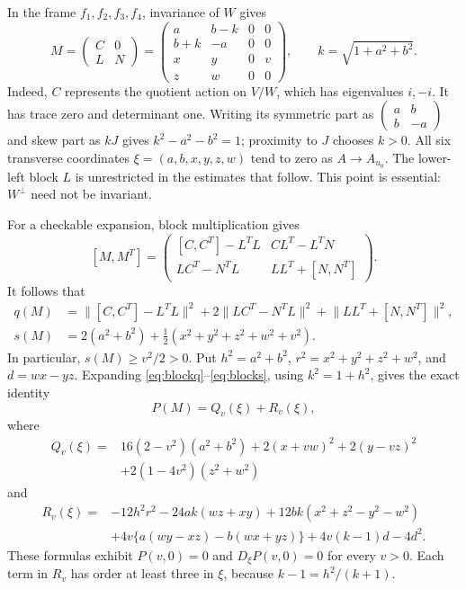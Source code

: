 \documentclass[11pt]{article}
\newcommand{\norm}[1]{\lVert #1\rVert}
\begin{document}
In the frame \(f_1,f_2,f_3,f_4\), invariance of \(W\) gives
\begin{equation}\label{eq:slice}
 M=\begin{pmatrix}C&0\\L&N\end{pmatrix}
  =\begin{pmatrix}
  a&b-k&0&0\\ b+k&-a&0&0\\
  x&y&0&v\\ z&w&0&0
  \end{pmatrix},
 \qquad k=\sqrt{1+a^2+b^2}.
\end{equation}
Indeed, \(C\) represents the quotient action on \(V/W\), which has
eigenvalues \(i,-i\). It has trace zero and determinant one.
Writing its symmetric part as
\(\begin{pmatrix}a&b\\b&-a\end{pmatrix}\) and skew part as \(kJ\)
gives \(k^2-a^2-b^2=1\); proximity to \(J\) chooses \(k>0\).
All six transverse coordinates
\(\xi=(a,b,x,y,z,w)\) tend to zero as \(A\to A_{u_0}\).
The lower-left block \(L\) is unrestricted in the estimates that follow.
This point is essential: \(W^\perp\) need not be invariant.

For a checkable expansion, block multiplication gives
\[
 [M,M^T]=
 \begin{pmatrix}
 [C,C^T]-L^TL&CL^T-L^TN\\
 LC^T-N^TL&LL^T+[N,N^T]
 \end{pmatrix}.
\]
It follows that
\begin{align}
 q(M)&=\norm{[C,C^T]-L^TL}^2+
 2\norm{LC^T-N^TL}^2+\norm{LL^T+[N,N^T]}^2,\label{eq:blockq}\\
 s(M)&=2(a^2+b^2)+\tfrac12(x^2+y^2+z^2+w^2+v^2).\label{eq:blocks}
\end{align}
In particular, \(s(M)\ge v^2/2>0\).
Put \(h^2=a^2+b^2\), \(r^2=x^2+y^2+z^2+w^2\), and \(d=wx-yz\).
Expanding \eqref{eq:blockq}--\eqref{eq:blocks}, using \(k^2=1+h^2\),
gives the exact identity
\begin{equation}\label{eq:QR}
 P(M)=Q_v(\xi)+R_v(\xi),
\end{equation}
where
\begin{equation}\label{eq:Q}
\begin{aligned}
 Q_v(\xi)={}&16(2-v^2)(a^2+b^2)
       +2(x+vw)^2+2(y-vz)^2\\
       &+2(1-4v^2)(z^2+w^2)
\end{aligned}
\end{equation}
and
\begin{equation}\label{eq:R}
\begin{aligned}
 R_v(\xi)={}&-12h^2r^2-24ak(wz+xy)
       +12bk(x^2+z^2-y^2-w^2)\\
 &+4v\{a(wy-xz)-b(wx+yz)\}
       +4v(k-1)d-4d^2.
\end{aligned}
\end{equation}
These formulas exhibit \(P(v,0)=0\) and \(D_\xi P(v,0)=0\) for
every \(v>0\). Each term in \(R_v\) has order at least three in
\(\xi\), because \(k-1=h^2/(k+1)\).
\end{document}
